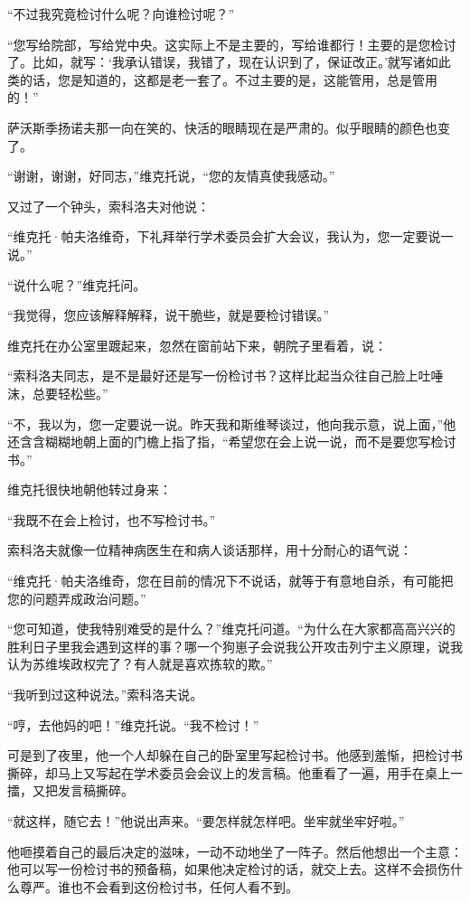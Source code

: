“不过我究竟检讨什么呢？向谁检讨呢？”

“您写给院部，写给党中央。这实际上不是主要的，写给谁都行！主要的是您检讨了。比如，就写：‘我承认错误，我错了，现在认识到了，保证改正。’就写诸如此类的话，您是知道的，这都是老一套了。不过主要的是，这能管用，总是管用的！”

萨沃斯季扬诺夫那一向在笑的、快活的眼睛现在是严肃的。似乎眼睛的颜色也变了。

“谢谢，谢谢，好同志，”维克托说，“您的友情真使我感动。”

又过了一个钟头，索科洛夫对他说：

“维克托·帕夫洛维奇，下礼拜举行学术委员会扩大会议，我认为，您一定要说一说。”

“说什么呢？”维克托问。

“我觉得，您应该解释解释，说干脆些，就是要检讨错误。”

维克托在办公室里踱起来，忽然在窗前站下来，朝院子里看着，说：

“索科洛夫同志，是不是最好还是写一份检讨书？这样比起当众往自己脸上吐唾沫，总要轻松些。”

“不，我以为，您一定要说一说。昨天我和斯维琴谈过，他向我示意，说上面，”他还含含糊糊地朝上面的门檐上指了指，“希望您在会上说一说，而不是要您写检讨书。”

维克托很快地朝他转过身来：

“我既不在会上检讨，也不写检讨书。”

索科洛夫就像一位精神病医生在和病人谈话那样，用十分耐心的语气说：

“维克托·帕夫洛维奇，您在目前的情况下不说话，就等于有意地自杀，有可能把您的问题弄成政治问题。”

“您可知道，使我特别难受的是什么？”维克托问道。“为什么在大家都高高兴兴的胜利日子里我会遇到这样的事？哪一个狗崽子会说我公开攻击列宁主义原理，说我认为苏维埃政权完了？有人就是喜欢拣软的欺。”

“我听到过这种说法。”索科洛夫说。

“哼，去他妈的吧！”维克托说。“我不检讨！”

可是到了夜里，他一个人却躲在自己的卧室里写起检讨书。他感到羞惭，把检讨书撕碎，却马上又写起在学术委员会会议上的发言稿。他重看了一遍，用手在桌上一擂，又把发言稿撕碎。

“就这样，随它去！”他说出声来。“要怎样就怎样吧。坐牢就坐牢好啦。”

他咂摸着自己的最后决定的滋味，一动不动地坐了一阵子。然后他想出一个主意：他可以写一份检讨书的预备稿，如果他决定检讨的话，就交上去。这样不会损伤什么尊严。谁也不会看到这份检讨书，任何人看不到。

